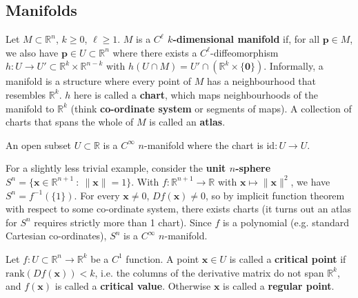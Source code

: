 \documentclass[letter-paper]{tufte-book}
\newenvironment{example}[1][Example]{\begin{trivlist}
\item[\hskip \labelsep {\bfseries #1}]}{\end{trivlist}}
\begin{document}

\subsection{Manifolds}

Let $M \subset \mathbb{R}^n$, $k \geq 0$, $\ell \geq 1$. $M$ is a
\textbf{$C^\ell$ $k$-dimensional manifold} if, for all $\boldsymbol{p} \in M$,
we also have $\boldsymbol{p} \in U \subset \mathbb{R}^n$ where there exists a
$C^\ell$-diffeomorphism $h : U \to U' \subset \mathbb{R}^k \times
\mathbb{R}^{n-k}$ with $h(U \cap M) = U' \cap (\mathbb{R}^k \times
\{\boldsymbol{0}\})$. Informally, a manifold is a structure where every point of
$M$ has a neighbourhood that resembles $\mathbb{R}^k$. $h$ here is called a
\textbf{chart}, which maps neighbourhoods of the manifold to $\mathbb{R}^k$
(think \textbf{co-ordinate system} or segments of maps). A collection of charts
that spans the whole of $M$ is called an \textbf{atlas}.

\begin{example}
  An open subset $U \subset \mathbb{R}$ is a $C^\infty$ $n$-manifold where the
  chart is $\mbox{id}: U \to U$.
  
  For a slightly less trivial example, consider the \textbf{unit $n$-sphere}
  $S^n = \{ \boldsymbol{x} \in \mathbb{R}^{n+1}\ :\ \|\boldsymbol{x}\| =
  1\}$. With $f : \mathbb{R}^{n+1} \to \mathbb{R}$
  with $\boldsymbol{x} \mapsto \|\boldsymbol{x}\|^2$, we have $S^n =
  f^{-1}(\{1\})$. For every $\boldsymbol{x} \neq 0$, $Df(\boldsymbol{x}) \neq
  0$, so by implicit function theorem with respect to some co-ordinate system,
  there exists charts (it turns out an atlas for $S^n$ requires strictly more
  than 1 chart). Since $f$ is a polynomial (e.g. standard Cartesian
  co-ordinates), $S^n$ is a $C^\infty$ $n$-manifold.
\end{example}

Let $f : U \subset \mathbb{R}^n \to \mathbb{R}^k$ be a $C^1$ function. A point
$\boldsymbol{x} \in U$ is called a \textbf{critical point} if
$\mbox{rank}(Df(\boldsymbol{x})) < k$, i.e. the columns of the derivative matrix
do not span $\mathbb{R}^k$, and $f(\boldsymbol{x})$ is called a \textbf{critical
value}. Otherwise $\boldsymbol{x}$ is called a \textbf{regular point}.
\end{document}
